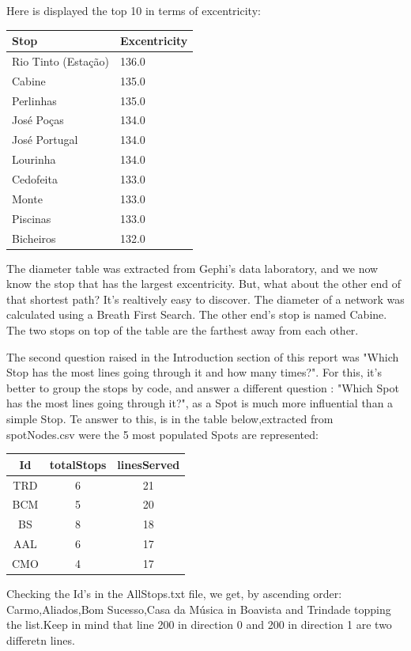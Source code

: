 \documentclass[12pt]{article}
\begin{document}
\begin{multicols}{2}
Here is displayed the top 10 in terms of excentricity:\\
\begin{tabular}[h]{|l|l|}
\hline
Stop & Excentricity\\
\hline
Rio Tinto (Estação) & 136.0	\\
Cabine & 135.0\\
Perlinhas & 135.0\\
José Poças & 134.0\\	
José Portugal & 134.0\\
Lourinha & 134.0\\
Cedofeita & 133.0\\
Monte & 133.0\\
Piscinas & 133.0\\	
Bicheiros & 132.0\\
\hline
\end{tabular}
The diameter table was extracted from Gephi's data laboratory, and we now know the stop that has the largest excentricity. But, what about the other end of that shortest path? It's realtively easy to discover. The diameter of a network was calculated using a Breath First Search. The other end's stop is named Cabine. The two stops on top of the table are the farthest away from each other. 




The second question raised in the Introduction section of this report was "Which Stop has the most lines going through it and how many times?". For this, it's better to group the stops by code, and answer a different question : "Which Spot has the most lines going through it?", as a Spot is much more influential than a simple Stop. Te answer to this, is in the table below,extracted from spotNodes.csv were the 5 most populated Spots are represented:
\begin{center}
\begin{tabular}[h]{ |c|c|c| }
\hline
    Id  & totalStops & linesServed\\
    \hline
    TRD & 6          & 21 \\
    BCM & 5          & 20 \\
    BS  & 8          & 18 \\
    AAL & 6          & 17 \\
    CMO & 4          & 17 \\
\hline
\end{tabular}
\end{center}
Checking the Id's in the AllStops.txt file, we get, by ascending order:
Carmo,Aliados,Bom Sucesso,Casa da Música in Boavista and Trindade topping the list.Keep in mind that line 200 in direction 0 and 200 in direction 1 are two differetn lines.


\end{multicols}
\end{document}
